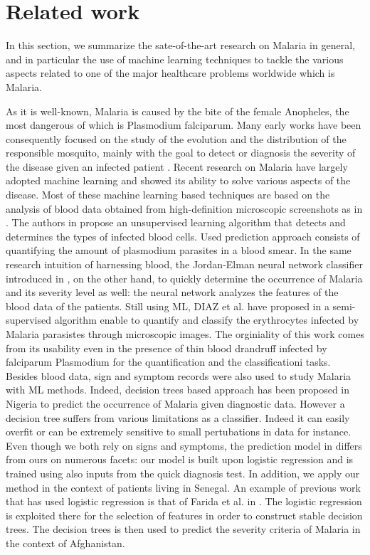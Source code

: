 \section{Related work}\label{related_work}
In this section, we summarize the sate-of-the-art research on Malaria in general, and in particular the
use of machine learning techniques to tackle the various aspects related to one of the 
major healthcare problems worldwide which is Malaria.

As it is well-known, Malaria is caused by the bite of the female Anopheles, the most dangerous of which
is Plasmodium falciparum. Many early works have been consequently focused on the study of the evolution and
the distribution of the responsible mosquito, mainly with the goal to detect or diagnosis the severity of the 
disease given an infected patient \cite{Fe03,Al09}. Recent research on Malaria have largely adopted machine learning
and showed its ability to solve various aspects of the disease. Most of these machine learning based techniques are 
based on the analysis of blood data obtained from high-definition microscopic screenshots as in \cite{Ku18}. The authors
in \cite{Ku18} propose an unsupervised learning algorithm that detects and determines the types of infected blood cells.
Used prediction approach consists of quantifying the amount of plasmodium parasites in a blood smear. In the same research intuition
of harnessing blood, the Jordan-Elman neural network classifier introduced in \cite{Ha15}, on the other hand, to quickly determine the occurrence 
of Malaria and its severity level as well: the neural network analyzes the features of the blood data of the patients.  
Still using ML, DIAZ et al. have proposed in \cite{Dia09} a semi-supervised algorithm enable to quantify and classify the 
erythrocytes infected by Malaria parasistes through microscopic images. The orginiality of this work comes from its usability
even in the presence of thin blood drandruff infected by falciparum Plasmodium for the quantification and the classificationi tasks.
Besides blood data, sign and symptom records were also used to study Malaria with ML methods. Indeed, decision trees based approach
has been proposed in Nigeria \cite{Ug10} to predict the occurrence of Malaria given diagnostic data. However a decision tree suffers 
from various limitations as a classifier. Indeed it can easily overfit or can be extremely sensitive to small pertubations in data for instance.
Even though we both rely on signs and symptoms, the prediction model in \cite{Ug10} differs from ours on numerous facets: our model is built upon
logistic regression and is trained using also inputs from the quick diagnosis test. In addition, we apply our method in the context of patients living in Senegal. 
An example of previous work that has used logistic regression is that of Farida et al. in \cite{}. The logistic regression is exploited
there for the selection of features in order to construct stable decision trees. The decision trees is then used to predict the severity
criteria of Malaria in the context of Afghanistan. 


